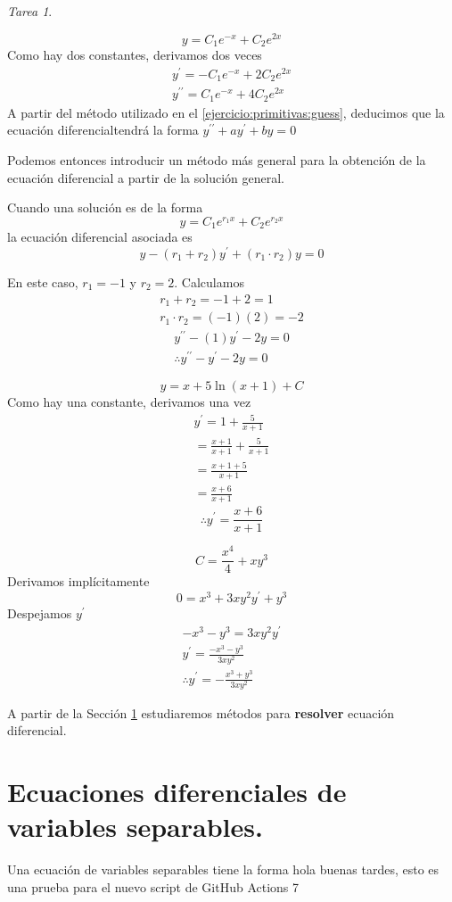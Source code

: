 \documentclass[12pt]{article} %
\theoremstyle{remark} %
\newtheorem{tarea}{Tarea}[section] %
\newcounter{ejercicio}[tarea]
\newcommand{\ed}{ecuación diferencial}
\begin{document}
\begin{tarea}
  \begin{ejercicio}[4]
    \[ y = C_1e^{-x} + C_2e^{2x} \]
    Como hay dos constantes, derivamos dos veces
    \begin{gather*}
      y^{\prime} = -C_1e^{-x} + 2C_2e^{2x}\\
      y^{\prime \prime} = C_1e^{-x} + 4C_2e^{2x}
    \end{gather*}
    A partir del método utilizado en el \cref{ejercicio:primitivas:guess}, deducimos que la \ed tendrá la forma 
    $y^{\prime \prime} + ay^{\prime} + by = 0$

    Podemos entonces introducir un método más general para la obtención de la ecuación diferencial a partir 
    de la solución general.

    Cuando una solución es de la forma \[ y = C_1e^{r_1x} + C_2e^{r_2x} \]
    la ecuación diferencial asociada es \[ y - (r_1 + r_2)y^{\prime} + (r_1 \cdot r_2)y = 0 \]

    En este caso, $r_1 = -1$ y $r_2 = 2$. Calculamos 
    \begin{gather*}
      r_1 + r_2 = -1 + 2 = 1\\
      r_1 \cdot r_2 = (-1)(2) = -2
    \end{gather*}
    \begin{gather*}
      y^{\prime \prime} -(1)y^{\prime} -2y = 0\\
      \therefore y^{\prime \prime} - y^{\prime} - 2y = 0
    \end{gather*}
  \end{ejercicio}
  \begin{ejercicio}[7]
    \[ y = x + 5 \ln(x+1) + C \]
    Como hay una constante, derivamos una vez
    \begin{gather*}
      y^{\prime} = 1 + \frac{5}{x+1}\\[0.5em]
      = \frac{x+1}{x+1} + \frac{5}{x+1}\\[0.5em]
      = \frac{x+1+5}{x+1}\\[0.5em]
      = \frac{x+6}{x+1}
    \end{gather*}
    \[ \therefore y^{\prime} = \frac{x+6}{x+1} \]
  \end{ejercicio}
  \begin{ejercicio}[9]
    \[ C = \frac{x^4}{4} + xy^{3} \]
    Derivamos implícitamente \[ 0 = x^3 + 3xy^2y^{\prime} + y^3 \]
    Despejamos $y^{\prime}$
    \begin{gather*}
      -x^3 - y^3 = 3xy^2y^{\prime}\\[0.5em]
      y^{\prime} = \frac{-x^3-y^3}{3xy^2}\\[0.5em]
      \therefore y^{\prime} = - \frac{x^3 + y^3}{3xy^2}
    \end{gather*}
  \end{ejercicio}
\end{tarea}
A partir de la Sección \ref{sec:variablesSeparables} estudiaremos métodos para \textbf{resolver} \ed .

\section{Ecuaciones diferenciales de variables separables.}
\label{sec:variablesSeparables}
Una ecuación de variables separables tiene la forma hola buenas tardes, esto es una prueba para el 
nuevo script de GitHub Actions 7
\end{document}
